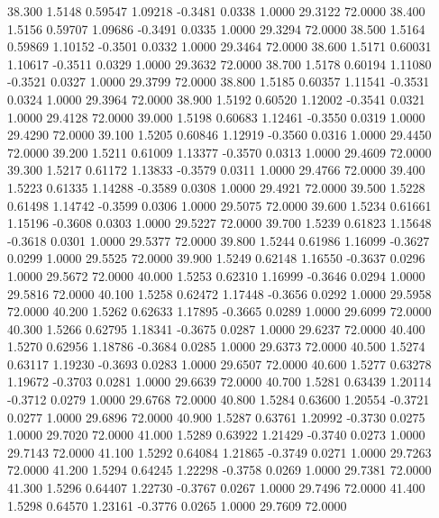   38.300   1.5148   0.59547   1.09218  -0.3481   0.0338   1.0000  29.3122  72.0000
  38.400   1.5156   0.59707   1.09686  -0.3491   0.0335   1.0000  29.3294  72.0000
  38.500   1.5164   0.59869   1.10152  -0.3501   0.0332   1.0000  29.3464  72.0000
  38.600   1.5171   0.60031   1.10617  -0.3511   0.0329   1.0000  29.3632  72.0000
  38.700   1.5178   0.60194   1.11080  -0.3521   0.0327   1.0000  29.3799  72.0000
  38.800   1.5185   0.60357   1.11541  -0.3531   0.0324   1.0000  29.3964  72.0000
  38.900   1.5192   0.60520   1.12002  -0.3541   0.0321   1.0000  29.4128  72.0000
  39.000   1.5198   0.60683   1.12461  -0.3550   0.0319   1.0000  29.4290  72.0000
  39.100   1.5205   0.60846   1.12919  -0.3560   0.0316   1.0000  29.4450  72.0000
  39.200   1.5211   0.61009   1.13377  -0.3570   0.0313   1.0000  29.4609  72.0000
  39.300   1.5217   0.61172   1.13833  -0.3579   0.0311   1.0000  29.4766  72.0000
  39.400   1.5223   0.61335   1.14288  -0.3589   0.0308   1.0000  29.4921  72.0000
  39.500   1.5228   0.61498   1.14742  -0.3599   0.0306   1.0000  29.5075  72.0000
  39.600   1.5234   0.61661   1.15196  -0.3608   0.0303   1.0000  29.5227  72.0000
  39.700   1.5239   0.61823   1.15648  -0.3618   0.0301   1.0000  29.5377  72.0000
  39.800   1.5244   0.61986   1.16099  -0.3627   0.0299   1.0000  29.5525  72.0000
  39.900   1.5249   0.62148   1.16550  -0.3637   0.0296   1.0000  29.5672  72.0000
  40.000   1.5253   0.62310   1.16999  -0.3646   0.0294   1.0000  29.5816  72.0000
  40.100   1.5258   0.62472   1.17448  -0.3656   0.0292   1.0000  29.5958  72.0000
  40.200   1.5262   0.62633   1.17895  -0.3665   0.0289   1.0000  29.6099  72.0000
  40.300   1.5266   0.62795   1.18341  -0.3675   0.0287   1.0000  29.6237  72.0000
  40.400   1.5270   0.62956   1.18786  -0.3684   0.0285   1.0000  29.6373  72.0000
  40.500   1.5274   0.63117   1.19230  -0.3693   0.0283   1.0000  29.6507  72.0000
  40.600   1.5277   0.63278   1.19672  -0.3703   0.0281   1.0000  29.6639  72.0000
  40.700   1.5281   0.63439   1.20114  -0.3712   0.0279   1.0000  29.6768  72.0000
  40.800   1.5284   0.63600   1.20554  -0.3721   0.0277   1.0000  29.6896  72.0000
  40.900   1.5287   0.63761   1.20992  -0.3730   0.0275   1.0000  29.7020  72.0000
  41.000   1.5289   0.63922   1.21429  -0.3740   0.0273   1.0000  29.7143  72.0000
  41.100   1.5292   0.64084   1.21865  -0.3749   0.0271   1.0000  29.7263  72.0000
  41.200   1.5294   0.64245   1.22298  -0.3758   0.0269   1.0000  29.7381  72.0000
  41.300   1.5296   0.64407   1.22730  -0.3767   0.0267   1.0000  29.7496  72.0000
  41.400   1.5298   0.64570   1.23161  -0.3776   0.0265   1.0000  29.7609  72.0000
